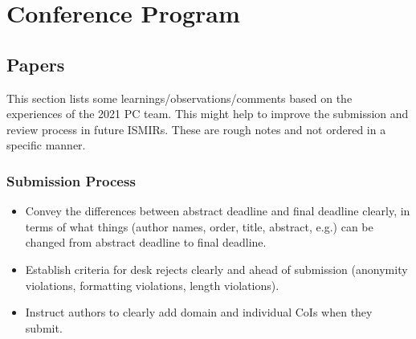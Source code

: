 \documentclass[%
10pt,								%
titlepage,						%
]
{scrartcl}
\begin{document}
    
\section{Conference Program}
    \subsection{Papers}
        This section lists some learnings/observations/comments based on the experiences of the 2021 PC team. This might help to improve the submission and review process in future ISMIRs. These are rough notes and not ordered in a specific manner.
        
        \subsubsection{Submission Process}
            \begin{itemize}
                \item Convey the differences between abstract deadline and final deadline clearly, in terms of what things (author names, order, title, abstract, e.g.) can be changed from abstract deadline to final deadline.
                \item   Establish criteria for desk rejects clearly and ahead of submission (anonymity violations, formatting violations, length violations).
                \item   Instruct authors to clearly add domain and individual CoIs when they submit.
            \end{itemize}
        
\end{document}
